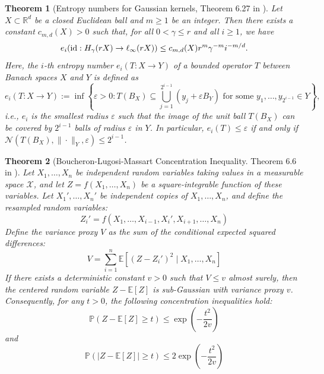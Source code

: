 \documentclass[12pt]{article}
\newtheorem{theorem}{Theorem}%
\begin{document}
\begin{theorem}[Entropy numbers for Gaussian kernels, Theorem 6.27 in \cite{christmann2008support}]\label{thm:entropy_gaussian} Let $X \subset \mathbb{R}^d$ be a closed Euclidean ball and $m \ge 1$ be an integer. Then there exists a constant $c_{m,d}(X)>0$ such that, for all $0 < \gamma \le r$ and all $i \ge 1$, we have
\[
e_i(\textnormal{id} : H_{\gamma}(rX) \to \ell_{\infty}(rX)) \le c_{m,d}(X)r^m \gamma^{-m} i^{-m/d}.
\]
Here, the $i$-th \emph{entropy number} $e_i(T:X\to Y)$ of a bounded operator $T$ between Banach spaces $X$ and $Y$ is defined as
\[
e_i(T:X\to Y) := \inf\!\left\{\varepsilon>0 : T(B_X)\subseteq \bigcup_{j=1}^{2^{i-1}}\!(y_j+\varepsilon B_Y)\text{ for some }y_1,\ldots,y_{2^{i-1}}\in Y\right\},
\]
i.e., $e_i$ is the smallest radius $\varepsilon$ such that the image of the unit ball $T(B_X)$ can be covered by $2^{i-1}$ balls of radius $\varepsilon$ in $Y$. In particular, $e_i(T)\leq\varepsilon$ if and only if $\mathcal{N}(T(B_X),\|\cdot\|_Y,\varepsilon)\leq 2^{i-1}$.
\end{theorem}
\begin{theorem}[Boucheron-Lugosi-Massart Concentration Inequality. Theorem 6.6 in \citet{boucheron2013concentration}]\label{thm:BMT_inequality}
    Let $X_1, \ldots, X_n$ be independent random variables taking values in a measurable space $\mathcal{X}$, and let $Z = f(X_1, \ldots, X_n)$ be a square-integrable function of these variables. Let $X_1', \ldots, X_n'$ be independent copies of $X_1, \ldots, X_n$, and define the resampled random variables:$$Z_i' = f(X_1, \ldots, X_{i-1}, X_i', X_{i+1}, \ldots, X_n)$$Define the variance proxy $V$ as the sum of the conditional expected squared differences:$$V = \sum_{i=1}^n \mathbb{E}\left[(Z - Z_i')^2 \mid X_1, \ldots, X_n\right]$$If there exists a deterministic constant $v > 0$ such that $V \le v$ almost surely, then the centered random variable $Z - \mathbb{E}[Z]$ is sub-Gaussian with variance proxy $v$. Consequently, for any $t > 0$, the following concentration inequalities hold:$$\mathbb{P}(Z - \mathbb{E}[Z] \ge t) \le \exp\left(-\frac{t^2}{2v}\right)$$and$$\mathbb{P}(|Z - \mathbb{E}[Z]| \ge t) \le 2\exp\left(-\frac{t^2}{2v}\right)$$
\end{theorem}

    
\end{document}
